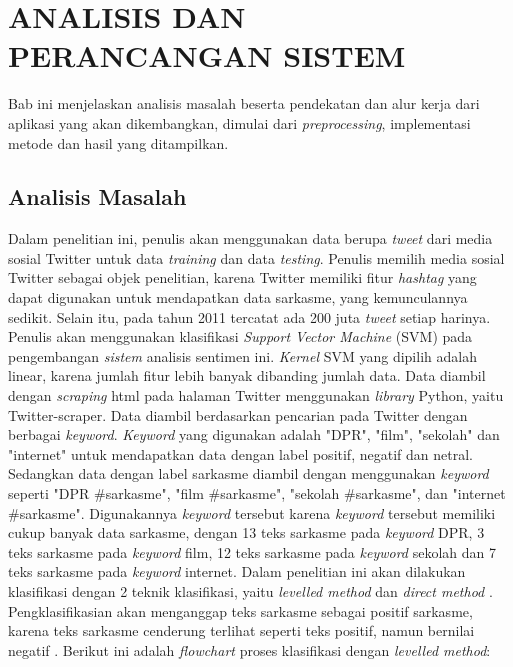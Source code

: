 \chapter{ANALISIS DAN PERANCANGAN SISTEM}


%
\vspace{4.5pt}

Bab ini menjelaskan analisis masalah beserta pendekatan dan alur kerja dari aplikasi yang akan dikembangkan, dimulai dari \textit{preprocessing}, implementasi metode dan hasil yang ditampilkan.
\section{Analisis Masalah}
Dalam penelitian ini, penulis akan menggunakan data berupa \textit{tweet} dari media sosial Twitter untuk data \textit{training} dan data \textit{testing}. Penulis memilih media sosial Twitter sebagai objek penelitian, karena Twitter memiliki fitur \textit{hashtag} yang dapat digunakan untuk mendapatkan data sarkasme, yang kemunculannya sedikit. Selain itu, pada tahun 2011 tercatat ada 200 juta \textit{tweet} setiap harinya. Penulis akan menggunakan klasifikasi \textit{Support Vector Machine} (SVM) pada pengembangan \textit{sistem} analisis sentimen ini. \textit{Kernel} SVM yang dipilih adalah linear, karena jumlah fitur lebih banyak dibanding jumlah data. Data diambil dengan \textit{scraping} html pada halaman Twitter menggunakan \textit{library} Python, yaitu Twitter-scraper. Data diambil berdasarkan pencarian pada Twitter dengan berbagai \textit{keyword}. \textit{Keyword} yang digunakan adalah "DPR", "film", "sekolah" dan "internet" untuk mendapatkan data dengan label positif, negatif 
dan netral. Sedangkan data dengan label sarkasme diambil dengan menggunakan \textit{keyword} seperti "DPR \#sarkasme", "film \#sarkasme", "sekolah \#sarkasme", dan "internet \#sarkasme". Digunakannya \textit{keyword} tersebut karena \textit{keyword} 
tersebut memiliki cukup banyak data sarkasme, dengan 13 teks sarkasme pada \textit{keyword }DPR, 3 teks sarkasme pada \textit{keyword} film, 12 teks sarkasme pada \textit{keyword} sekolah dan 7 teks sarkasme pada \textit{keyword} internet. Dalam penelitian ini akan dilakukan klasifikasi dengan 2 teknik klasifikasi, yaitu \textit{levelled method} dan \textit{direct method} \cite{5}. Pengklasifikasian akan menganggap teks sarkasme sebagai positif sarkasme, karena teks sarkasme cenderung terlihat seperti teks positif, namun bernilai negatif \cite{5}. Berikut ini adalah \textit{flowchart }
proses klasifikasi dengan \textit{levelled method}:

